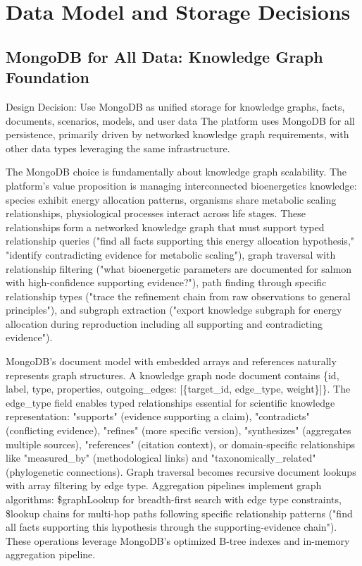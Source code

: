 \documentclass[12pt,a4paper]{article}
\begin{document}
\section{Data Model and Storage Decisions}

\subsection{MongoDB for All Data: Knowledge Graph Foundation}

\begin{rationale}{Design Decision: Use MongoDB as unified storage for knowledge graphs, facts, documents, scenarios, models, and user data}
The platform uses MongoDB for all persistence, primarily driven by networked knowledge graph requirements, with other data types leveraging the same infrastructure.
\end{rationale}

The MongoDB choice is fundamentally about knowledge graph scalability. The platform's value proposition is managing interconnected bioenergetics knowledge: species exhibit energy allocation patterns, organisms share metabolic scaling relationships, physiological processes interact across life stages. These relationships form a networked knowledge graph that must support typed relationship queries ("find all facts supporting this energy allocation hypothesis," "identify contradicting evidence for metabolic scaling"), graph traversal with relationship filtering ("what bioenergetic parameters are documented for salmon with high-confidence supporting evidence?"), path finding through specific relationship types ("trace the refinement chain from raw observations to general principles"), and subgraph extraction ("export knowledge subgraph for energy allocation during reproduction including all supporting and contradicting evidence").

MongoDB's document model with embedded arrays and references naturally represents graph structures. A knowledge graph node document contains \{id, label, type, properties, outgoing\_edges: [\{target\_id, edge\_type, weight\}]\}. The edge\_type field enables typed relationships essential for scientific knowledge representation: "supports" (evidence supporting a claim), "contradicts" (conflicting evidence), "refines" (more specific version), "synthesizes" (aggregates multiple sources), "references" (citation context), or domain-specific relationships like "measured\_by" (methodological links) and "taxonomically\_related" (phylogenetic connections). Graph traversal becomes recursive document lookups with array filtering by edge type. Aggregation pipelines implement graph algorithms: \$graphLookup for breadth-first search with edge type constraints, \$lookup chains for multi-hop paths following specific relationship patterns ("find all facts supporting this hypothesis through the supporting-evidence chain"). These operations leverage MongoDB's optimized B-tree indexes and in-memory aggregation pipeline.
\end{document}
